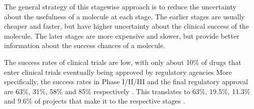 The general strategy of this stagewise approach is to reduce the uncertainty about the usefulness of
a molecule at each stage. The earlier stages are usually cheaper and faster, but have higher
uncertainty about the clinical success of the molecule. The later stages are more expensive and
slower, but provide better information about the success chances of a molecule.

The success rates of clinical trials are low, with only about 10\% of drugs that enter clinical
trials eventually being approved by regulatory agencies More specifically, the success rates in
Phase I/II/III and the final regulatory approval are 63\%, 31\%, 58\% and 85\% respectively
\citep{mullardParsingClinicalSuccess2016}. This translates to 63\%, 19.5\%, 11.3\% and 9.6\% of
projects that make it to the respective stages \citep{mullardParsingClinicalSuccess2016}.

